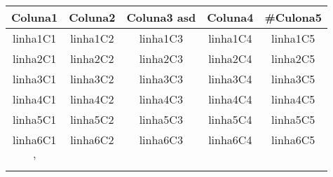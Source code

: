 \documentclass{article}
\begin{document}
            \begin{center}\begin{tabular}{||c c c c c||}  \hline Coluna1 &  Coluna2 &  Coluna3 asd &  Coluna4 &  #Culona5  \\ [0.5ex]   \hline linha1C1 &  linha1C2 &  linha1C3 &  linha1C4 &  linha1C5  \\   \hline linha2C1 &  linha2C2 &  linha2C3 &  linha2C4 &  linha2C5  \\   \hline linha3C1 &  linha3C2 &  linha3C3 &  linha3C4 &  linha3C5  \\   \hline linha4C1 &  linha4C2 &  linha4C3 &  linha4C4 &  linha4C5  \\   \hline linha5C1 &  linha5C2 &  linha5C3 &  linha5C4 &  linha5C5  \\   \hline linha6C1 &  linha6C2 &  linha6C3 &  linha6C4 &  linha6C5  \\   \hline'\end{tabular}
            \end{center}
        
\end{document}
